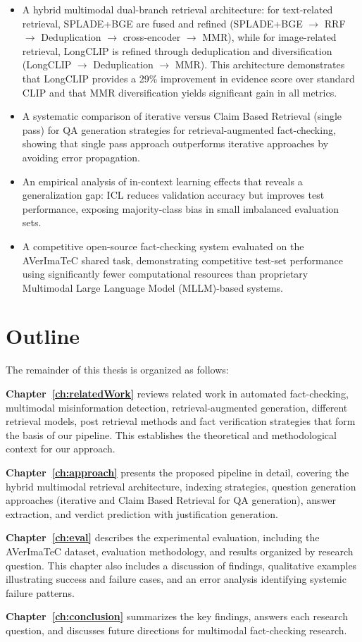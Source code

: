 \begin{itemize}
    \item A hybrid multimodal dual-branch retrieval architecture: for text-related retrieval, SPLADE+BGE are fused and refined (SPLADE+BGE $\rightarrow$ RRF $\rightarrow$ Deduplication $\rightarrow$ cross-encoder $\rightarrow$ MMR), while for image-related retrieval, LongCLIP is refined through deduplication and diversification (LongCLIP $\rightarrow$ Deduplication $\rightarrow$ MMR). This architecture demonstrates that LongCLIP provides a 29\% improvement in evidence score over standard CLIP and that MMR diversification yields significant gain in all metrics.
    \item A systematic comparison of iterative versus Claim Based Retrieval (single pass) for QA generation strategies for retrieval-augmented fact-checking, showing that single pass approach outperforms iterative approaches by avoiding error propagation.
    \item An empirical analysis of in-context learning effects that reveals a generalization gap: ICL reduces validation accuracy but improves test performance, exposing majority-class bias in small imbalanced evaluation sets.
    \item A competitive open-source fact-checking system evaluated on the AVerImaTeC shared task, demonstrating competitive test-set performance using significantly fewer computational resources than proprietary Multimodal Large Language Model (MLLM)-based systems.
\end{itemize}

\section{Outline}
\label{sec:intro:outline}


The remainder of this thesis is organized as follows:

\textbf{Chapter~\ref{ch:relatedWork}} reviews related work in automated fact-checking, multimodal misinformation detection, retrieval-augmented generation, different retrieval models, post retrieval methods and fact verification strategies that form the basis of our pipeline. This establishes the theoretical and methodological context for our approach.

\textbf{Chapter~\ref{ch:approach}} presents the proposed pipeline in detail, covering the hybrid multimodal retrieval architecture, indexing strategies, question generation approaches (iterative and Claim Based Retrieval for QA generation), answer extraction, and verdict prediction with justification generation.

\textbf{Chapter~\ref{ch:eval}} describes the experimental evaluation, including the AVerImaTeC dataset, evaluation methodology, and results organized by research question. This chapter also includes a discussion of findings, qualitative examples illustrating success and failure cases, and an error analysis identifying systemic failure patterns.

\textbf{Chapter~\ref{ch:conclusion}} summarizes the key findings, answers each research question, and discusses future directions for multimodal fact-checking research.